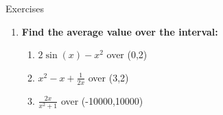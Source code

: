 \documentclass[../revisedmain.tex]{subfiles}
\begin{document}
	\begin{center}
		\LARGE Exercises
	\end{center}
	\begin{enumerate}
		\item \textbf{Find the average value over the interval:}
		\begin{enumerate}
			\item $2\sin(x)-x^2$ over (0,2)
			\item $x^2-x+\frac{1}{2x}$ over (3,2)
			\item $\frac{2x}{x^2+1}$ over (-10000,10000)
		\end{enumerate}
	\end{enumerate}
\end{document}
